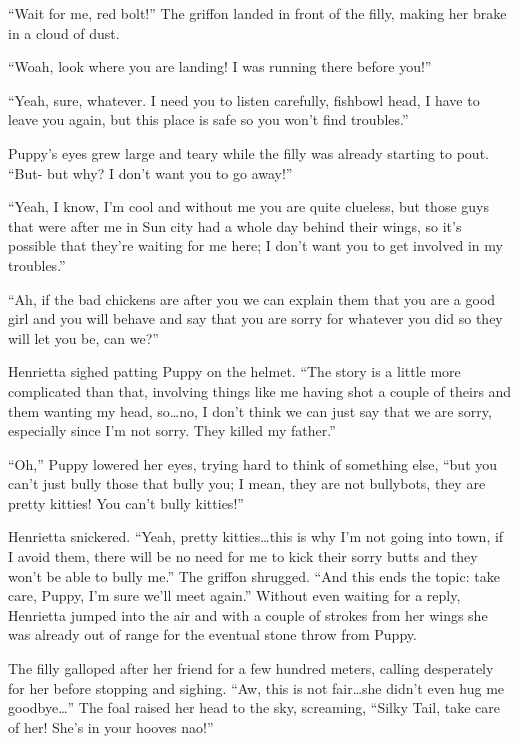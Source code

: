 ``Wait for me, red bolt!'' The griffon landed in front of the filly, making her brake in a cloud of dust.

``Woah, look where you are landing! I was running there before you!''

``Yeah, sure, whatever. I need you to listen carefully, fishbowl head, I have to leave you again, but this place is safe so you won't find troubles.''

Puppy's eyes grew large and teary while the filly was already starting to pout. ``But- but why? I don't want you to go away!''

``Yeah, I know, I'm cool and without me you are quite clueless, but those guys that were after me in Sun city had a whole day behind their wings, so it's possible that they're waiting for me here; I don't want you to get involved in my troubles.''

``Ah, if the bad chickens are after you we can explain them that you are a good girl and you will behave and say that you are sorry for whatever you did so they will let you be, can we?''

Henrietta sighed patting Puppy on the helmet. ``The story is a little more complicated than that, involving things like me having shot a couple of theirs and them wanting my head, so\dots no, I don't think we can just say that we are sorry, especially since I'm not sorry. They killed my father.''

``Oh,'' Puppy lowered her eyes, trying hard to think of something else, ``but you can't just bully those that bully you; I mean, they are not bullybots, they are pretty kitties! You can't bully kitties!''

Henrietta snickered. ``Yeah, pretty kitties\dots this is why I'm not going into town, if I avoid them, there will be no need for me to kick their sorry butts and they won't be able to bully me.'' The griffon shrugged. ``And this ends the topic: take care, Puppy, I'm sure we'll meet again.'' Without even waiting for a reply, Henrietta jumped into the air and with a couple of strokes from her wings she was already out of range for the eventual stone throw from Puppy.

The filly galloped after her friend for a few hundred meters, calling desperately for her before stopping and sighing. ``Aw, this is not fair\dots she didn't even hug me goodbye\dots'' The foal raised her head to the sky, screaming, ``Silky Tail, take care of her! She's in your hooves nao!''

\horizonline

